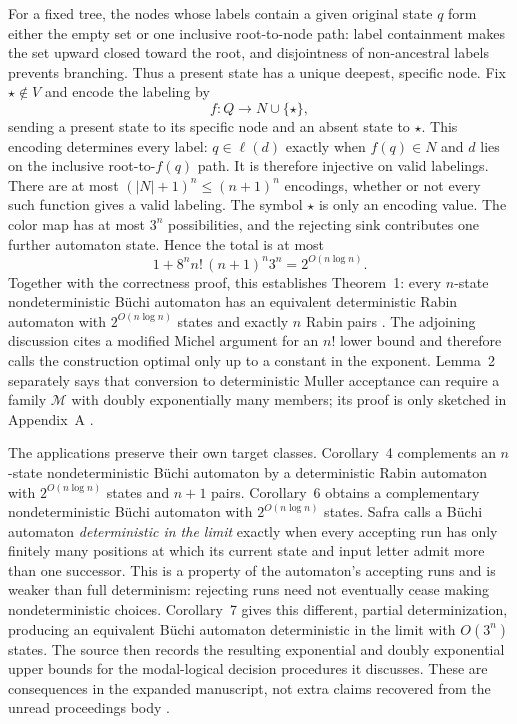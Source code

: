 For a fixed tree, the nodes whose labels contain a given original state
\(q\) form either the empty set or one inclusive root-to-node path:
label containment makes the set upward closed toward the root, and
disjointness of non-ancestral labels prevents branching.  Thus a present
state has a unique deepest, specific node.  Fix \(\star\notin V\) and encode
the labeling by
\[
 f:Q\longrightarrow N\cup\{\star\},
\]
sending a present state to its specific node and an absent state to
\(\star\).  This encoding determines every label: \(q\in\ell(d)\) exactly
when \(f(q)\in N\) and \(d\) lies on the inclusive root-to-\(f(q)\) path.
It is therefore injective on valid labelings.  There are at most
\((|N|+1)^n\le(n+1)^n\) encodings, whether or not every such function
gives a valid labeling.  The symbol \(\star\) is only an encoding value.
The color map has at most \(3^n\) possibilities, and the rejecting sink
contributes one further automaton state.  Hence the total is at most
\[
 1+8^n n!\,(n+1)^n3^n=2^{O(n\log n)}.
\]
Together with the correctness proof, this establishes Theorem~1: every
\(n\)-state nondeterministic B\"uchi automaton has an equivalent deterministic
Rabin automaton with \(2^{O(n\log n)}\) states and exactly \(n\) Rabin pairs
\cite[p.~12]{Safra1995Extended}.
The adjoining discussion cites a modified Michel argument for an \(n!\)
lower bound and therefore calls the construction optimal only up to a constant
in the exponent.  Lemma~2 separately says that conversion to deterministic
Muller acceptance can require a family \(\mathcal M\) with doubly exponentially
many members; its proof is only sketched in Appendix~A
\cite[pp.~12--13, 17--18]{Safra1995Extended}.

The applications preserve their own target classes.  Corollary~4 complements
an \(n\)-state nondeterministic B\"uchi automaton by a deterministic Rabin
automaton with \(2^{O(n\log n)}\) states and \(n+1\) pairs.  Corollary~6 obtains
a complementary nondeterministic B\"uchi automaton with
\(2^{O(n\log n)}\) states.  Safra calls a B\"uchi automaton
\emph{deterministic in the limit} exactly when every accepting run has only
finitely many positions at which its current state and input letter admit more
than one successor.  This is a property of the automaton's accepting runs and
is weaker than full determinism: rejecting runs need not eventually cease
making nondeterministic choices.  Corollary~7 gives this different, partial
determinization, producing an equivalent B\"uchi automaton deterministic in the
limit with \(O(3^n)\) states.  The source then records the resulting
exponential and doubly exponential upper bounds for the modal-logical decision
procedures it discusses.  These are consequences in the expanded manuscript, not extra
claims recovered from the unread proceedings body
\cite[pp.~13--16]{Safra1995Extended}.

